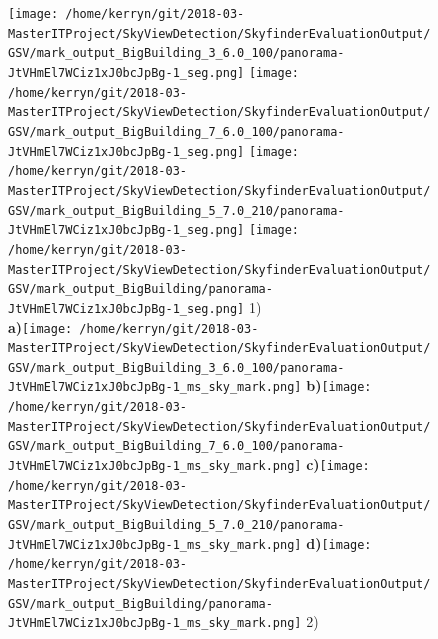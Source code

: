 \documentclass{article}
\begin{document}
\begin{figure}
\centering    
\textbf{}\texttt{[image: /home/kerryn/git/2018-03-MasterITProject/SkyViewDetection/SkyfinderEvaluationOutput/GSV/mark\_output\_BigBuilding\_3\_6.0\_100/panorama-JtVHmEl7WCiz1xJ0bcJpBg-1\_seg.png]} 
\textbf{}\texttt{[image: /home/kerryn/git/2018-03-MasterITProject/SkyViewDetection/SkyfinderEvaluationOutput/GSV/mark\_output\_BigBuilding\_7\_6.0\_100/panorama-JtVHmEl7WCiz1xJ0bcJpBg-1\_seg.png]} 
\textbf{}\texttt{[image: /home/kerryn/git/2018-03-MasterITProject/SkyViewDetection/SkyfinderEvaluationOutput/GSV/mark\_output\_BigBuilding\_5\_7.0\_210/panorama-JtVHmEl7WCiz1xJ0bcJpBg-1\_seg.png]} 
\textbf{}\texttt{[image: /home/kerryn/git/2018-03-MasterITProject/SkyViewDetection/SkyfinderEvaluationOutput/GSV/mark\_output\_BigBuilding/panorama-JtVHmEl7WCiz1xJ0bcJpBg-1\_seg.png]} \scriptsize{1)}
\\
\textbf{\scriptsize{a)}}\texttt{[image: /home/kerryn/git/2018-03-MasterITProject/SkyViewDetection/SkyfinderEvaluationOutput/GSV/mark\_output\_BigBuilding\_3\_6.0\_100/panorama-JtVHmEl7WCiz1xJ0bcJpBg-1\_ms\_sky\_mark.png]} 
\textbf{\scriptsize{b)}}\texttt{[image: /home/kerryn/git/2018-03-MasterITProject/SkyViewDetection/SkyfinderEvaluationOutput/GSV/mark\_output\_BigBuilding\_7\_6.0\_100/panorama-JtVHmEl7WCiz1xJ0bcJpBg-1\_ms\_sky\_mark.png]} 
\textbf{\scriptsize{c)}}\texttt{[image: /home/kerryn/git/2018-03-MasterITProject/SkyViewDetection/SkyfinderEvaluationOutput/GSV/mark\_output\_BigBuilding\_5\_7.0\_210/panorama-JtVHmEl7WCiz1xJ0bcJpBg-1\_ms\_sky\_mark.png]} 
\textbf{\scriptsize{d)}}\texttt{[image: /home/kerryn/git/2018-03-MasterITProject/SkyViewDetection/SkyfinderEvaluationOutput/GSV/mark\_output\_BigBuilding/panorama-JtVHmEl7WCiz1xJ0bcJpBg-1\_ms\_sky\_mark.png]} \scriptsize{2)}
\end{figure} 
\clearpage %
\end{document}
